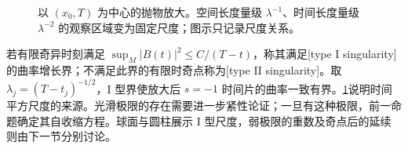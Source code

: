 \begin{figure}[htbp]
	\centering
	
	\caption{以 \((x_0,T)\) 为中心的抛物放大。空间长度量级 \(\lambda^{-1}\)、时间长度量级 \(\lambda^{-2}\) 的观察区域变为固定尺度；图示只记录尺度关系。}
	\label{g3:fig:mcf-parabolic-rescaling}
\end{figure}

若有限奇异时刻满足 \(\sup_M|B(t)|^2\le C/(T-t)\)，称其满足[type I singularity]的曲率增长界；不满足此界的有限时奇点称为[type II singularity]。取 \(\lambda_j=(T-t_j)^{-1/2}\)，I 型界使放大后 \(s=-1\) 时间片的曲率一致有界。\cref{g3:fig:mcf-parabolic-rescaling}说明时间平方尺度的来源。光滑极限的存在需要进一步紧性论证；一旦有这种极限，前一命题确定其自收缩方程。球面与圆柱展示 I 型尺度，弱极限的重数及奇点后的延续则由下一节分别讨论。
